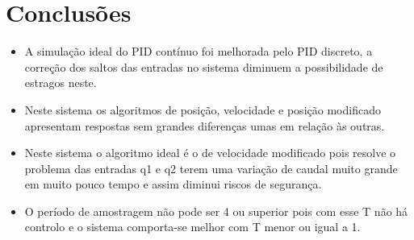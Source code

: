 \documentclass[11pt]{article}
\begin{document}
\section{Conclusões}
\begin{itemize}
\item A simulação ideal do PID contínuo foi melhorada pelo PID discreto, a correção dos saltos das entradas no sistema diminuem a possibilidade de estragos neste.
\item Neste sistema os algoritmos de posição, velocidade e posição modificado apresentam respostas sem grandes diferenças umas em relação às outras.
\item Neste sistema o algoritmo ideal é o de velocidade modificado pois resolve o problema das entradas q1 e q2 terem uma variação de caudal muito grande em muito pouco tempo e assim diminui riscos de segurança.
\item O período de amostragem não pode ser 4 ou superior pois com esse T não há controlo e o sistema comporta-se melhor com T menor ou igual a 1.
\end{itemize}
\end{document}
